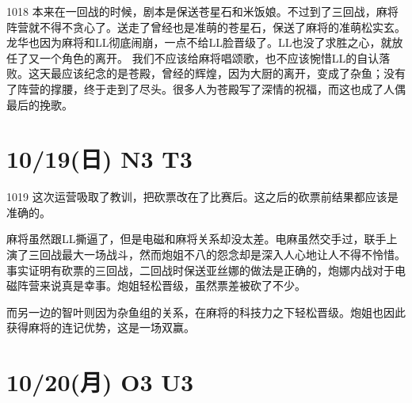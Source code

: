1018 本来在一回战的时候，剧本是保送苍星石和米饭娘。不过到了三回战，麻将阵营就不得不贪心了。送走了曾经也是准萌的苍星石，保送了麻将的准萌松实玄。龙华也因为麻将和LL彻底闹崩，一点不给LL脸晋级了。LL也没了求胜之心，就放任了又一个角色的离开。
我们不应该给麻将唱颂歌，也不应该惋惜LL的自认落败。这天最应该纪念的是苍殿，曾经的辉煌，因为大厨的离开，变成了杂鱼；没有了阵营的撑腰，终于走到了尽头。很多人为苍殿写了深情的祝福，而这也成了人偶最后的挽歌。

\section{10/19(日) N3 T3}


1019 这次运营吸取了教训，把砍票改在了比赛后。这之后的砍票前结果都应该是准确的。

麻将虽然跟LL撕逼了，但是电磁和麻将关系却没太差。电麻虽然交手过，联手上演了三回战最大一场战斗，然而炮姐不八的怨念却是深入人心地让人不得不怜惜。事实证明有砍票的三回战，二回战时保送亚丝娜的做法是正确的，炮娜内战对于电磁阵营来说真是幸事。炮姐轻松晋级，虽然票差被砍了不少。

而另一边的智叶则因为杂鱼组的关系，在麻将的科技力之下轻松晋级。炮姐也因此获得麻将的连记优势，这是一场双赢。

\section{10/20(月) O3 U3}

